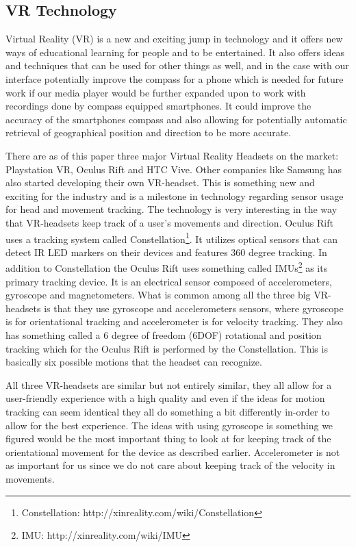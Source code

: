 \subsection{VR Technology}
\label{vrtechnology}
Virtual Reality (VR) is a new and exciting jump in technology and it offers new ways of educational learning for people and to be entertained. It also offers ideas and techniques that can be used for other things as well, and in the case with our interface potentially improve the compass for a phone which is needed for future work if our media player would be further expanded upon to work with recordings done by compass equipped smartphones. It could improve the accuracy of the smartphones compass and also allowing for potentially automatic retrieval of geographical position and direction to be more accurate. 

There are as of this paper three major Virtual Reality Headsets on the market: Playstation VR, Oculus Rift and HTC Vive. Other companies like Samsung has also started developing their own VR-headset. This is something new and exciting for the industry and is a milestone in technology regarding sensor usage for head and movement tracking. The technology is very interesting in the way that VR-headsets keep track of a user's movements and direction. Oculus Rift uses a tracking system called Constellation\footnote{Constellation: http://xinreality.com/wiki/Constellation}. It utilizes optical sensors that can detect IR LED markers on their devices and features 360 degree tracking. In addition to Constellation the Oculus Rift uses something called IMUs\footnote{IMU: http://xinreality.com/wiki/IMU} as its primary tracking device. It is an electrical sensor composed of accelerometers, gyroscope and magnetometers. What is common among all the three big VR-headsets is that they use gyroscope and accelerometers sensors, where gyroscope is for orientational tracking and accelerometer is for velocity tracking. They also has something called a 6 degree of freedom (6DOF) rotational and position tracking which for the Oculus Rift is performed by the Constellation. This is basically six possible motions that the headset can recognize.

All three VR-headsets are similar but not entirely similar, they all allow for a user-friendly experience with a high quality and even if the ideas for motion tracking can seem identical they all do something a bit differently in-order to allow for the best experience. The ideas with using gyroscope is something we figured would be the most important thing to look at for keeping track of the orientational movement for the device as described earlier. Accelerometer is not as important for us since we do not care about keeping track of the velocity in movements.


